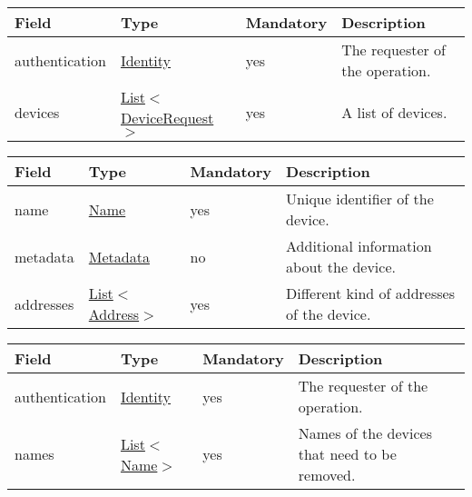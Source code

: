 \documentclass[a4paper]{arrowhead}
\newcommand{\pref}[1]{{\textcolor{ArrowheadGrey}{\hyperref[sec:model:primitives:#1]{#1}}}}
\begin{document}
 
\begin{table}[ht!]
\begin{tabularx}{\textwidth}{| p{2.5cm} | p{3.4cm} | p{2cm} | X |} \hline
\rowcolor{gray!33} Field & Type & Mandatory & Description \\ \hline
authentication & \hyperref[sec:model:Identity]{Identity} & yes & The requester of the operation. \\ \hline
devices & \pref{List}$<$\hyperref[sec:model:DeviceRequest]{DeviceRequest}$>$ & yes & A list of devices. \\ \hline
\end{tabularx}
\end{table}

\clearpage

 
\begin{table}[ht!]
\begin{tabularx}{\textwidth}{| p{2.5cm} | p{2.5cm} | p{2cm} | X |} \hline
\rowcolor{gray!33} Field & Type & Mandatory & Description \\ \hline
name & \pref{Name} & yes & Unique identifier of the device. \\ \hline
metadata &\hyperref[sec:model:Metadata]{Metadata} & no & Additional information about the device. \\ \hline
addresses &  \pref{List}$<$\pref{Address}$>$ & yes & Different kind of addresses of the device.  \\ \hline
\end{tabularx}
\end{table}


\begin{table}[ht!]
\begin{tabularx}{\textwidth}{| p{2.5cm} | p{2.5cm} | p{2cm} | X |} \hline
\rowcolor{gray!33} Field & Type & Mandatory & Description \\ \hline
authentication & \hyperref[sec:model:Identity]{Identity} & yes & The requester of the operation. \\ \hline
names &  \pref{List}$<$\pref{Name}$>$ & yes & Names of the devices that need to be removed. \\ \hline
\end{tabularx}
\end{table}

\end{document}
